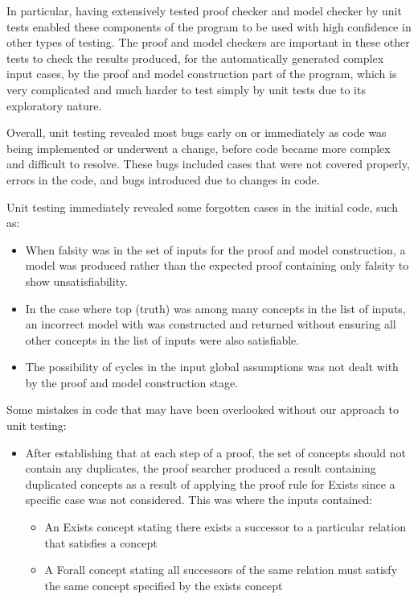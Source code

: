 In particular, having extensively tested proof checker and model checker by unit tests enabled these components of the program to be used with high confidence in other types of testing. The proof and model checkers are important in these other tests to check the results produced, for the automatically generated complex input cases, by the proof and model construction part of the program, which is very complicated and much harder to test simply by unit tests due to its exploratory nature.

Overall, unit testing revealed most bugs early on or immediately as code was being implemented or underwent a change, before code became more complex and difficult to resolve. These bugs included cases that were not covered properly, errors in the code, and bugs introduced due to changes in code.

Unit testing immediately revealed some forgotten cases in the initial code, such as:

\begin{itemize}
\item When falsity was in the set of inputs for the proof and model construction, a model was produced rather than the expected proof containing only falsity to show unsatisfiability.
\item In the case where top (truth) was among many concepts in the list of inputs, an incorrect model with was constructed and returned without ensuring all other concepts in the list of inputs were also satisfiable.
\item The possibility of cycles in the input global assumptions was not dealt with by the proof and model construction stage.
\end{itemize}

Some mistakes in code that may have been overlooked without our approach to unit testing:

\begin{itemize}
\item After establishing that at each step of a proof, the set of concepts should not contain any duplicates, the proof searcher produced a result containing duplicated concepts as a result of applying the proof rule for Exists since a specific case was not considered. This was where the inputs contained:
\begin{itemize}
\item An Exists concept stating there exists a successor to a particular relation that satisfies a concept
\item A Forall concept stating all successors of the same relation must satisfy the same concept specified by the exists concept
\end{itemize}
\end{itemize}

